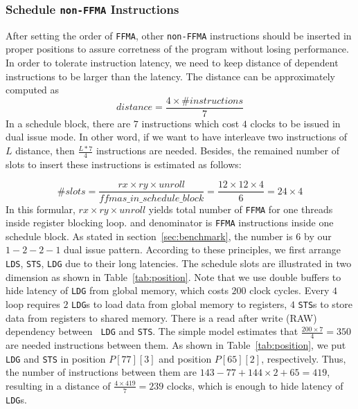 \subsubsection{Schedule {\tt non-FFMA} Instructions}

After setting the order of {\tt FFMA}, other {\tt non-FFMA} instructions should be inserted in proper positions to assure
corretness of the program without losing performance. In order to tolerate instruction latency, we need to keep distance of dependent instructions to be larger than the latency. The distance can be approximately computed as
\begin{displaymath}
distance = \frac{4\times\#instructions}{7}
\end{displaymath}
In a schedule block, there are $7$ instructions which cost $4$ clocks to be issued in dual issue mode. In other word, if we want to have interleave
two instructions of $L$ distance, then $\frac{L*7}{4}$ instructions are needed. Besides, the remained number of slots to insert these instructions is estimated as follows:

\begin{displaymath}
\#slots = \frac{rx\times ry\times unroll}{ffmas\_in\_schedule\_block}=\frac{12\times 12\times 4}{6}=24\times 4
\end{displaymath}
In this formular, $rx\times ry\times unroll$ yields total number of {\tt FFMA} for one threads inside register blocking loop.
and denominator is {\tt FFMA} instructions inside one schedule block. As stated in section~\ref{sec:benchmark}, the number is $6$ by our $1-2-2-1$ dual issue pattern.
According to these principles, we first arrange {\tt LDS}, {\tt STS}, {\tt LDG} due to their long latencies. The
schedule slots are illustrated in two dimension as shown in Table~\ref{tab:position}.
Note that we use double buffers to hide latency of {\tt LDG} from global memory, which costs $200$ clock cycles.
Every $4$ loop requires $2$ {\tt LDG}s to load data from global memory to registers, $4$ {\tt STS}s to store data from registers to shared memory. There is a read after write (RAW) dependency between {\tt
LDG} and {\tt STS}. The simple model estimates that $\frac{200\times 7}{4} = 350$ are needed instructions between them.
As shown in Table~\ref{tab:position}, we put {\tt LDG} and  {\tt STS} in position $P[77][3]$ and position $P[65][2]$, respectively. Thus, the number of instructions between them are $143-77 + 144\times 2 +
65=419$, resulting in a distance of $\frac{4\times 419}{7}=239$ clocks, which is enough to hide latency of {\tt LDG}s.

